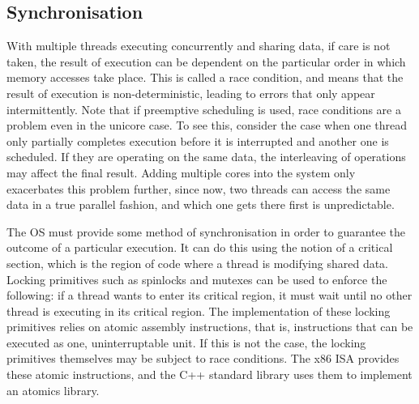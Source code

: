 \documentclass[bsc,frontabs,singlespacing,parskip,deptreport]{infthesis}
\begin{document}
\subsection{Synchronisation} \label{synchronisation-challenges}
With multiple threads executing concurrently and sharing data, if care is not taken, the result of execution can be dependent on the particular order in which memory accesses take place. This is called a race condition, and means that the result of execution is non-deterministic, leading to errors that only appear intermittently. Note that if preemptive scheduling is used, race conditions are a problem even in the unicore case. To see this, consider the case when one thread only partially completes execution before it is interrupted and another one is scheduled. If they are operating on the same data, the interleaving of operations may affect the final result. Adding multiple cores into the system only exacerbates this problem further, since now, two threads can access the same data in a true parallel fashion, and which one gets there first is unpredictable. 

The OS must provide some method of synchronisation in order to guarantee the outcome of a particular execution. It can do this using the notion of a critical section, which is the region of code where a thread is modifying shared data. Locking primitives such as spinlocks and mutexes can be used to enforce the following: if a thread wants to enter its critical region, it must wait until no other thread is executing in its critical region. The implementation of these locking primitives relies on atomic assembly instructions, that is, instructions that can be executed as one, uninterruptable unit. If this is not the case, the locking primitives themselves may be subject to race conditions. The x86 ISA provides these atomic instructions, and the C++ standard library uses them to implement an atomics library.
\end{document}

